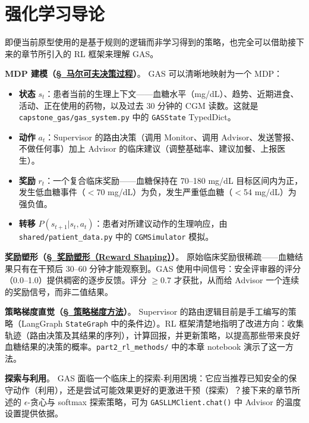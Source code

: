 \chapter{强化学习导论}
\label{sec:rl}

\begin{keybox}
即便当前原型使用的是基于规则的逻辑而非学习得到的策略，也完全可以借助接下来的章节所引入的 RL 框架来理解 GAS。

\textbf{MDP 建模（\hyperref[the-markov-decision-process-mdp]{\S~马尔可夫决策过程}）}。
GAS 可以清晰地映射为一个 MDP：
\begin{itemize}
  \item \textbf{状态} $s_t$：患者当前的生理上下文——血糖水平（mg/dL）、趋势、近期进食、活动、正在使用的药物，以及过去 30 分钟的 CGM 读数。这就是 \texttt{capstone\_gas/gas\_system.py} 中的 \texttt{GASState} TypedDict。
  \item \textbf{动作} $a_t$：Supervisor 的路由决策（调用 Monitor、调用 Advisor、发送警报、不做任何事）加上 Advisor 的临床建议（调整基础率、建议加餐、上报医生）。
  \item \textbf{奖励} $r_t$：一个复合临床奖励——血糖保持在 70--180 mg/dL 目标区间内为正，发生低血糖事件（$<$70 mg/dL）为负，发生严重低血糖（$<$54 mg/dL）为强负值。
  \item \textbf{转移} $P(s_{t+1}|s_t, a_t)$：患者对所建议动作的生理响应，由 \texttt{shared/patient\_data.py} 中的 \texttt{CGMSimulator} 模拟。
\end{itemize}

\textbf{奖励塑形（\hyperref[reward-shaping]{\S~奖励塑形（Reward Shaping）}）}。
原始临床奖励很稀疏——血糖结果只有在干预后 30--60 分钟才能观察到。GAS 使用中间信号：安全评审器的评分（0.0--1.0）提供稠密的逐步反馈。评分 $\geq 0.7$ 才获批，从而给 Advisor 一个连续的奖励信号，而非二值结果。

\textbf{策略梯度直觉（\hyperref[policy-gradient-methods-reinforce]{\S~策略梯度方法}）}。
Supervisor 的路由逻辑目前是手工编写的策略（LangGraph \texttt{StateGraph} 中的条件边）。RL 框架清楚地指明了改进方向：收集轨迹（路由决策及其结果的序列），计算回报，并更新策略，以提高那些带来良好血糖结果的决策的概率。\texttt{part2\_rl\_methods/} 中的本章 notebook 演示了这一方法。

\textbf{探索与利用}。
GAS 面临一个临床上的探索-利用困境：它应当推荐已知安全的保守动作（利用），还是尝试可能效果更好的更激进干预（探索）？接下来的章节所述的 $\epsilon$-贪心与 softmax 探索策略，可为 \texttt{GASLLMClient.chat()} 中 Advisor 的温度设置提供依据。
\end{keybox}

